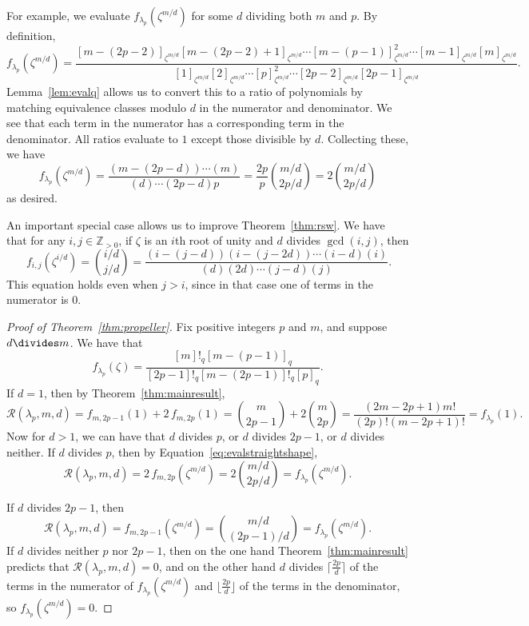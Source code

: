 \documentclass[12pt]{amsart}
\theoremstyle{definition}
\theoremstyle{remark}
\numberwithin{equation}{section}
\begin{document}
For example, we evaluate $f_{\lambda_p}(\zeta^{m/d})$ for some $d$ dividing both $m$ and $p$. By definition,
\[ f_{\lambda_p}(\zeta^{m/d}) = \frac{[m-(2p-2)]_{\zeta^{m/d}}[m-(2p-2)+1]_{\zeta^{m/d}} \cdots [m-(p-1)]_{\zeta^{m/d}}^2 \cdots [m-1]_{\zeta^{m/d}}[m]_{\zeta^{m/d}}}{[1]_{\zeta^{m/d}}[2]_{\zeta^{m/d}} \cdots [p]_{\zeta^{m/d}}^2 \cdots [2p-2]_{\zeta^{m/d}}[2p-1]_{\zeta^{m/d}}}.\]
Lemma~\ref{lem:evalq} allows us to convert this to a ratio of polynomials by matching equivalence classes modulo $d$ in the numerator and denominator. We see that each term in the numerator has a corresponding term in the denominator. All ratios evaluate to $1$ except those divisible by $d$. Collecting these, we have
\[ f_{\lambda_p}(\zeta^{m/d}) = \frac{(m-(2p-d)) \cdots  (m)}{(d) \cdots  (2p-d) p} = \frac{2p}{p}  \binom{m/d}{2p/d} = 2 \binom{m/d}{2p/d}\]    
as desired. 

An important special case allows us to improve Theorem~\ref{thm:rsw}. We have that for any $i, j \in \mathbb{Z}_{> 0}$, if $\zeta$ is an $i$th root of unity and $d$ divides $\gcd(i,j)$, then
\begin{equation}~\label{eq:evalstraightshape}
f_{i,j}(\zeta^{i/d}) = \binom{i/d}{j/d} = \frac{(i-(j-d))(i-(j-2d)) \cdots  (i-d)(i)}{(d)  (2d)  \cdots  (j-d) (j)}. 
\end{equation}
This equation holds even when $j > i$, since in that case one of terms in the numerator is $0$. 



\begin{proof}[Proof of Theorem~\ref{thm:propeller}] Fix positive integers $p$ and $m$, and suppose $d \divides m$. We have that \[ f_{\lambda_p}(\zeta) = \frac{[m]!_q [m-(p-1)]_q}{[2p-1]!_q [m-(2p-1)]!_q [p]_q }.\]  If $d = 1$, then by Theorem~\ref{thm:mainresult}, 
\[ \mathcal{R}(\lambda_p,m,d) = f_{m,2p-1}(1) + 2 \, f_{m,2p}(1) = \binom{m}{2p-1} + 2 \binom{m}{2p} = \frac{(2m-2p+1)m!}{(2p)!(m-2p+1)!} = f_{\lambda_p}(1). \]
Now for $d > 1$, we can have that $d$ divides $p$, or $d$ divides $2p-1$, or $d$ divides neither. If $d$ divides $p$, then by Equation~\ref{eq:evalstraightshape},
\[ \mathcal{R}(\lambda_p,m,d) = 2 \, f_{m,2p}(\zeta^{m/d}) = 2\binom{m/d}{2p/d} = f_{\lambda_p}(\zeta^{m/d}).\]

If $d$ divides $2p-1$,  then
\[ \mathcal{R}(\lambda_p,m,d) =  f_{m,2p-1}(\zeta^{m/d}) = \binom{m/d}{(2p-1)/d} = f_{\lambda_p}(\zeta^{m/d}).\]
If $d$ divides neither $p$ nor $2p-1$, then on the one hand Theorem~\ref{thm:mainresult} predicts that $\mathcal{R}(\lambda_p,m,d) = 0$, and on the other hand $d$ divides $\lceil{\frac{2p}{d}}\rceil$ of the terms in the numerator of $f_{\lambda_p}(\zeta^{m/d})$ and $\lfloor{\frac{2p}{d}}\rfloor$ of the terms in the denominator, so $f_{\lambda_p}(\zeta^{m/d}) = 0$. 
\end{proof}
\end{document}
